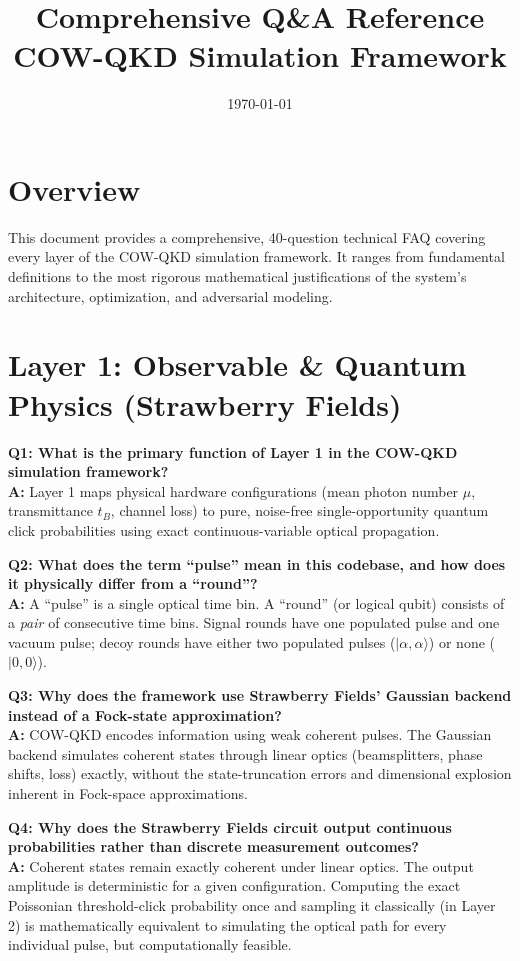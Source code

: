 \documentclass[11pt, a4paper]{article}
\title{\textbf{Comprehensive Q\&A Reference}\\ \Large COW-QKD Simulation Framework}
\author{}
\date{\today}
\begin{document}
\maketitle

\section*{Overview}
This document provides a comprehensive, 40-question technical FAQ covering every layer of the COW-QKD simulation framework. It ranges from fundamental definitions to the most rigorous mathematical justifications of the system's architecture, optimization, and adversarial modeling.

\section{Layer 1: Observable \& Quantum Physics (Strawberry Fields)}

\textbf{Q1: What is the primary function of Layer 1 in the COW-QKD simulation framework?} \\
\textbf{A:} Layer 1 maps physical hardware configurations (mean photon number $\mu$, transmittance $t_B$, channel loss) to pure, noise-free single-opportunity quantum click probabilities using exact continuous-variable optical propagation.

\textbf{Q2: What does the term ``pulse'' mean in this codebase, and how does it physically differ from a ``round''?} \\
\textbf{A:} A ``pulse'' is a single optical time bin. A ``round'' (or logical qubit) consists of a \textit{pair} of consecutive time bins. Signal rounds have one populated pulse and one vacuum pulse; decoy rounds have either two populated pulses ($|\alpha, \alpha\rangle$) or none ($|0, 0\rangle$).

\textbf{Q3: Why does the framework use Strawberry Fields' Gaussian backend instead of a Fock-state approximation?} \\
\textbf{A:} COW-QKD encodes information using weak coherent pulses. The Gaussian backend simulates coherent states through linear optics (beamsplitters, phase shifts, loss) exactly, without the state-truncation errors and dimensional explosion inherent in Fock-space approximations.

\textbf{Q4: Why does the Strawberry Fields circuit output continuous probabilities rather than discrete measurement outcomes?} \\
\textbf{A:} Coherent states remain exactly coherent under linear optics. The output amplitude is deterministic for a given configuration. Computing the exact Poissonian threshold-click probability once and sampling it classically (in Layer 2) is mathematically equivalent to simulating the optical path for every individual pulse, but computationally feasible.
\end{document}
